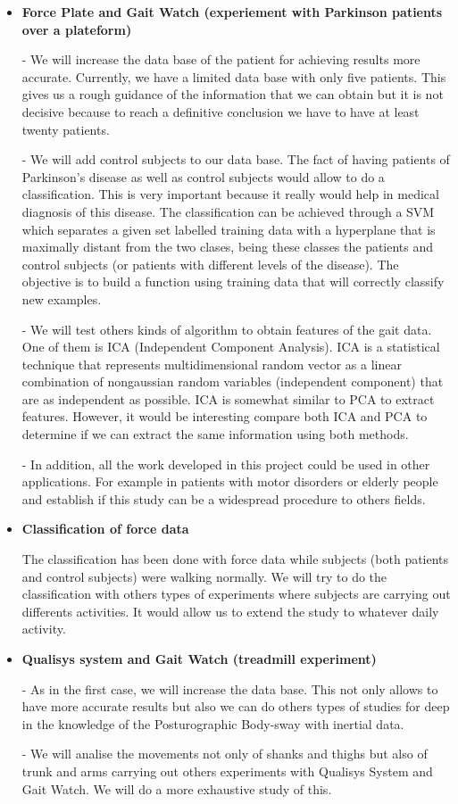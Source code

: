 \begin{itemize}
\item \textbf{Force Plate and Gait Watch (experiement with Parkinson patients over a plateform)}

- We will increase the data base of the patient for achieving results more accurate. Currently, we have a limited data base with only five patients. This gives us a rough guidance of the information that we can obtain but it is not decisive because to reach a definitive conclusion we have to have at least twenty patients.

-	We will add control subjects to our data base. The fact of having patients of Parkinson’s disease as well as control subjects would allow to do a classification. This is very important because it really would help in medical diagnosis of this disease.
The classification can be achieved through a SVM which separates a given set labelled training data with a hyperplane that is maximally distant from the two clases, being these classes the patients and control subjects (or patients with different levels of the disease). The objective is to build a function using training data that will correctly classify new examples.

- We will test others kinds of algorithm to obtain features of the gait data. One of them is ICA (Independent Component Analysis).  ICA is a statistical technique that represents multidimensional random vector  as a linear combination of nongaussian random variables (independent component) that are as independent as possible. ICA is somewhat similar to PCA to extract features. However, it would be interesting compare both ICA and PCA to determine if we can extract the same information using both methods. 

- In addition, all the work developed in this project could be used in other applications. For example in patients with motor disorders or elderly people and establish if this study can be a widespread procedure to others fields.

\item \textbf{Classification of force data}

The classification has been done with force data while subjects (both patients and control subjects) were walking normally. We will try to do the classification with others types of experiments where subjects are carrying out differents activities. It would allow us to extend the study to whatever daily activity.

\item \textbf{Qualisys system and Gait Watch (treadmill experiment)}

-	As in the first case, we will increase the data base. This not only allows to have more accurate results but also we can do others types of studies for deep in the knowledge of the Posturographic Body-sway  with inertial data.

-	We will analise the movements not only of shanks and thighs but also of trunk and arms carrying out others experiments with Qualisys System and Gait Watch. We will do a more exhaustive study of this.
	
\end{itemize}